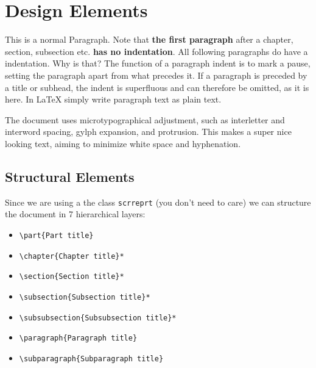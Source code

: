 \chapter{Design Elements}
\label{ch:DesignElements}

This is a normal Paragraph. Note that \textbf{the first paragraph} after a chapter, section, subsection etc. \textbf{has no indentation}. All following paragraphs do have a indentation. Why is that? The function of a paragraph indent is to mark a pause, setting the paragraph apart from what precedes it. If a paragraph is preceded by a title or subhead, the indent is superfluous and can therefore be omitted, as it is here. In \LaTeX{} simply write paragraph text as plain text.

The document uses microtypographical adjustment, such as interletter and interword spacing, gylph expansion, and protrusion. This makes a super nice looking text, aiming to minimize white space and hyphenation.

\section{Structural Elements}

Since we are using a the  class \texttt{scrreprt} (you don’t need to care) we can structure the document in 7 hierarchical layers:

\begin{itemize}
	\setlength\itemsep{-0.75em} %
	\item \verb|\part{Part title}|
	\item \verb|\chapter{Chapter title}*|
	\item \verb|\section{Section title}*|
	\item \verb|\subsection{Subsection title}*|
	\item \verb|\subsubsection{Subsubsection title}*|
	\item \verb|\paragraph{Paragraph title}|
	\item \verb|\subparagraph{Subparagraph title}|
\end{itemize}


